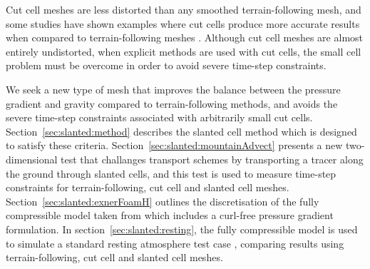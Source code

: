 
Cut cell meshes are less distorted than any smoothed terrain-following mesh, and some studies have shown examples where cut cells produce more accurate results when compared to terrain-following meshes \citep{good2014,steppeler2013}.
Although cut cell meshes are almost entirely undistorted, when explicit methods are used with cut cells, the small cell problem must be overcome in order to avoid severe time-step constraints.

We seek a new type of mesh that improves the balance between the pressure gradient and gravity compared to terrain-following methods, and avoids the severe time-step constraints associated with arbitrarily small cut cells.  Section~\ref{sec:slanted:method} describes the slanted cell method which is designed to satisfy these criteria.
Section~\ref{sec:slanted:mountainAdvect} presents a new two-dimensional test that challanges transport schemes by transporting a tracer along the ground through slanted cells, and this test is used to measure time-step constraints for terrain-following, cut cell and slanted cell meshes.
Section~\ref{sec:slanted:exnerFoamH} outlines the discretisation of the fully compressible model taken from \citet{weller-shahrokhi2014} which includes a curl-free pressure gradient formulation.
In section~\ref{sec:slanted:resting}, the fully compressible model is used to simulate a standard resting atmosphere test case \citep{klemp2011}, comparing results using terrain-following, cut cell and slanted cell meshes.





